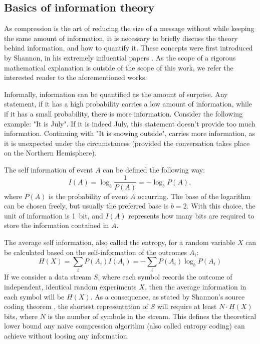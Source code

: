   
    \subsection{Basics of information theory}
      As compression is the art of reducing the size of a message without while keeping the same amount of information, it is necessary to briefly discuss the theory behind information, and how to quantify it. These concepts were first introduced by Shannon, in his extremely influential papers \cite{shannon_mathematical_1948,shannon_mathematical_1948-1,shannon_prediction_1951}. As the scope of a rigorous mathematical explanation is outside of the scope of this work, we refer the interested reader to the aforementioned works.
  
      Informally, information can be quantified as the amount of surprise. Any statement, if it has a high probability carries a low amount of information, while if it has a small probability, there is more information. Consider the following example: "It is July". If it is indeed July, this statement doesn't provide too much information. Continuing with "It is snowing outside", carries more information, as it is unexpected under the circumstances (provided the conversation takes place on the Northern Hemisphere).
  
      The self information of event $A$ can be defined the following way:
      \begin{equation}
        I(A) = \log_b \frac{1}{P(A)} = - \log_b P(A),
        \label{eq:selfInfo}
      \end{equation}
      where $P(A)$ is the probability of event $A$ occurring. The base of the logarithm can be chosen freely, but usually the preferred base is $b=2$. With this choice, the unit of information is \SI{1}{bit}, and $I(A)$ represents how many bits are required to store the information contained in $A$.
  
      The average self information, also called the entropy, for a random variable $X$ can be calculated based on the self-information of the outcomes $A_i$:
      \begin{equation}
        H(X) = \sum_i P(A_i)I(A_i) = - \sum_i P(A_i) \log_b P(A_i)
        \label{eq:entropy}
      \end{equation}
      If we consider a data stream $S$, where each symbol records the outcome of independent, identical random experiments $X$, then the average information in each symbol will be $H(X)$. As a consequence, as stated by Shannon's source coding theorem \cite{shannon_mathematical_1948}, the shortest representation of $S$ will require at least $N\cdot H(X)$ bits, where $N$ is the number of symbols in the stream. This defines the theoretical lower bound any nai\:ve compression algorithm (also called entropy coding) can achieve without loosing any information.
  
